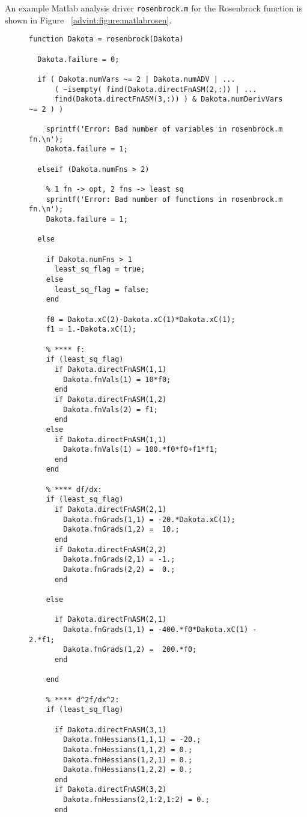 An example Matlab analysis driver {\tt rosenbrock.m} for the
Rosenbrock function is shown in Figure
~\ref{advint:figure:matlabrosen}.
\begin{figure} \centering
\begin{bigbox}
\begin{tiny}
\begin{verbatim}
function Dakota = rosenbrock(Dakota)

  Dakota.failure = 0;

  if ( Dakota.numVars ~= 2 | Dakota.numADV | ...
      ( ~isempty( find(Dakota.directFnASM(2,:)) | ...
      find(Dakota.directFnASM(3,:)) ) & Dakota.numDerivVars ~= 2 ) )
    
    sprintf('Error: Bad number of variables in rosenbrock.m fn.\n');
    Dakota.failure = 1;

  elseif (Dakota.numFns > 2) 
  
    % 1 fn -> opt, 2 fns -> least sq
    sprintf('Error: Bad number of functions in rosenbrock.m fn.\n');
    Dakota.failure = 1;

  else
 
    if Dakota.numFns > 1 
      least_sq_flag = true;
    else
      least_sq_flag = false;
    end

    f0 = Dakota.xC(2)-Dakota.xC(1)*Dakota.xC(1);
    f1 = 1.-Dakota.xC(1);
  
    % **** f:
    if (least_sq_flag) 
      if Dakota.directFnASM(1,1)
        Dakota.fnVals(1) = 10*f0;
      end
      if Dakota.directFnASM(1,2)
        Dakota.fnVals(2) = f1;
      end
    else
      if Dakota.directFnASM(1,1)
        Dakota.fnVals(1) = 100.*f0*f0+f1*f1;
      end
    end
  
    % **** df/dx:
    if (least_sq_flag)
      if Dakota.directFnASM(2,1)
        Dakota.fnGrads(1,1) = -20.*Dakota.xC(1);
        Dakota.fnGrads(1,2) =  10.;
      end
      if Dakota.directFnASM(2,2)
        Dakota.fnGrads(2,1) = -1.;
        Dakota.fnGrads(2,2) =  0.;
      end
  
    else 
  
      if Dakota.directFnASM(2,1)
        Dakota.fnGrads(1,1) = -400.*f0*Dakota.xC(1) - 2.*f1;
        Dakota.fnGrads(1,2) =  200.*f0;
      end
      
    end

    % **** d^2f/dx^2:
    if (least_sq_flag)
     
      if Dakota.directFnASM(3,1)
        Dakota.fnHessians(1,1,1) = -20.;
        Dakota.fnHessians(1,1,2) = 0.;
        Dakota.fnHessians(1,2,1) = 0.;
        Dakota.fnHessians(1,2,2) = 0.;
      end
      if Dakota.directFnASM(3,2)
        Dakota.fnHessians(2,1:2,1:2) = 0.;
      end
      

\end{verbatim}
\end{tiny}
\end{bigbox}
\end{figure}
